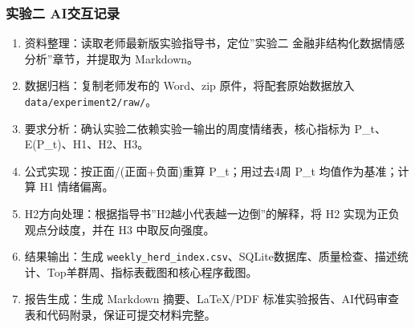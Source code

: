 \subsubsection{实验二 AI交互记录}\label{ux5b9eux9a8cux4e8c-aiux4ea4ux4e92ux8bb0ux5f55}

\begin{enumerate}
\def\labelenumi{\arabic{enumi}.}
\tightlist
\item
  资料整理：读取老师最新版实验指导书，定位''实验二 金融非结构化数据情感分析''章节，并提取为 Markdown。
\item
  数据归档：复制老师发布的 Word、zip 原件，将配套原始数据放入 \texttt{data/experiment2/raw/}。
\item
  要求分析：确认实验二依赖实验一输出的周度情绪表，核心指标为 P\_t、E(P\_t)、H1、H2、H3。
\item
  公式实现：按正面/(正面+负面)重算 P\_t；用过去4周 P\_t 均值作为基准；计算 H1 情绪偏离。
\item
  H2方向处理：根据指导书''H2越小代表越一边倒''的解释，将 H2 实现为正负观点分歧度，并在 H3 中取反向强度。
\item
  结果输出：生成 \texttt{weekly\_herd\_index.csv}、SQLite数据库、质量检查、描述统计、Top羊群周、指标表截图和核心程序截图。
\item
  报告生成：生成 Markdown 摘要、LaTeX/PDF 标准实验报告、AI代码审查表和代码附录，保证可提交材料完整。
\end{enumerate}
